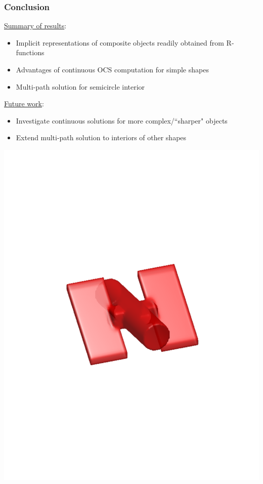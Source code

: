 \documentclass{beamer}
\begin{document}
\begin{frame}[t]
\frametitle{Conclusion}
\underline{Summary of results}:
\begin{itemize}
\item Implicit representations of composite objects readily obtained from R-functions 
\item Advantages of continuous OCS computation for simple shapes
\item Multi-path solution for semicircle interior
\end{itemize}
\underline{Future work}:
\begin{itemize}
\item Investigate continuous solutions for more complex/``sharper" objects 
\item Extend multi-path solution to interiors of other shapes
\end{itemize}
\centerline{\includegraphics[scale=0.3]{./figs/Satellite.pdf}}
\end{frame}
\end{document}

